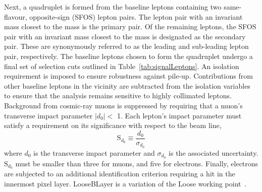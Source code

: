 Next, a quadruplet is formed from the baseline leptons containing two same-flavour, opposite-sign (SFOS) lepton pairs. The lepton pair with an invariant mass closest to the \Z mass is the primary pair. Of the remaining leptons, the SFOS pair with an invariant mass closest to the \Z mass is designated as the secondary pair. These are synonymously referred to as the leading and sub-leading lepton pair, respectively. 
The baseline leptons chosen to form the quadruplet undergo a final set of selection cuts outlined in Table~\ref{tab:signalLeptons}. An isolation requirement is imposed to ensure robustness against pile-up. Contributions from other baseline leptons in the vicinity are subtracted from the isolation variables to ensure that the analysis remains sensitive to highly collimated leptons. Background from cosmic-ray muons is suppressed by requiring that a muon's transverse impact parameter $|d_0|<$ \unit{1}{\mm}. Each lepton's impact parameter must satisfy a requirement on its significance with respect to the beam line,
\begin{equation}
    \text{S}_{d_0}\equiv\dfrac{d_0}{\sigma_{d_0}}
\end{equation}
where $d_0$ is the transverse impact parameter and $\sigma_{d_0}$ is the associated uncertainty. $\text{S}_{d_0}$ must be smaller than three for muons, and five for electrons. Finally, electrons are subjected to an additional identification criterion requiring a hit in the innermost pixel layer. LooseBLayer is a variation of the Loose working point~\cite{m4l2021_paper}. 

